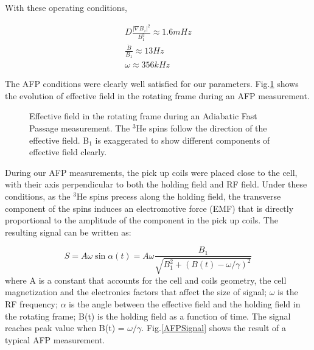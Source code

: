With these operating conditions, 

\begin{subequations}
	\begin{gather}
	D\frac{|\nabla B_{z}|^{2}}{B_{1}^{2}} \approx 1.6mHz\\
	\frac{\dot B}{B_{1}} \approx 13Hz\\
	\omega \approx 356kHz
	\end{gather}
\end{subequations}

The AFP conditions were clearly well satisfied for our parameters. Fig.\ref{AFP} shows the evolution of effective field in the rotating frame during an AFP measurement.

\begin{figure}[H]
	\centering
	\caption{{ Effective field in the rotating frame during an Adiabatic Fast Passage measurement. The $^{3}$He spins follow the direction of the effective field. B$_{1}$ is exaggerated to show different components of effective field clearly.}}
	\label{AFP}
\end{figure}

During our AFP measurements, the pick up coils were placed close to the cell, with their axis perpendicular to both the holding field and RF field. Under these conditions, as the $^{3}$He spins precess along the holding field, the transverse component of the spins induces an electromotive force (EMF) that is directly proportional to the amplitude of the component in the pick up coils. The resulting signal can be written as:

\begin{equation}
S=A\omega \sin{\alpha(t)}=A\omega \frac{B_{1}}{\sqrt{B_{1}^{2}+(B(t)-\omega/\gamma)^{2}}}
\end{equation}
where A is a constant that accounts for the cell and coils geometry, the cell magnetization and the electronics factors that affect the size of signal; $\omega$ is the RF frequency; $\alpha$ is the angle between the effective field and the holding field in the rotating frame; B(t) is the holding field as a function of time. The signal reaches peak value when B(t) = $\omega/\gamma$. Fig.\ref{AFPSignal} shows the result of a typical AFP measurement.

